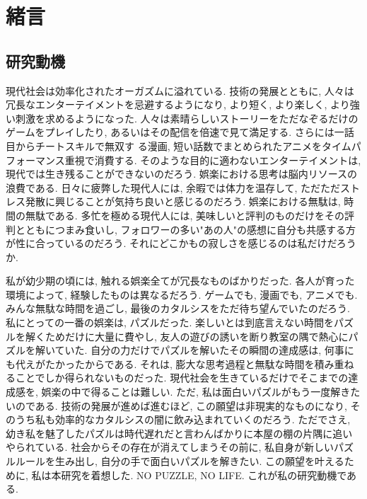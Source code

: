\chapter{緒言}
\section{研究動機}\label{section:Motivation}
現代社会は効率化されたオーガズムに溢れている. 技術の発展とともに, 人々は冗長なエンターテイメントを忌避するようになり, より短く, より楽しく, より強い刺激を求めるようになった. 人々は素晴らしいストーリーをただなぞるだけのゲームをプレイしたり, あるいはその配信を倍速で見て満足する. さらには一話目からチートスキルで無双す
る漫画, 短い話数でまとめられたアニメをタイムパフォーマンス重視で消費する. そのような目的に適わないエンターテイメントは, 現代では生き残ることができないのだろう. 娯楽における思考は脳内リソースの浪費である. 日々に疲弊した現代人には, 余暇では体力を温存して, ただただストレス発散に興じることが気持ち良いと感じるのだろう. 娯楽における無駄は, 時間の無駄である. 多忙を極める現代人には, 美味しいと評判のものだけをその評判とともにつまみ食いし, フォロワーの多い"あの人"の感想に自分も共感する方が性に合っているのだろう. それにどこかもの寂しさを感じるのは私だけだろうか.

私が幼少期の頃には, 触れる娯楽全てが冗長なものばかりだった. 各人が育った環境によって, 経験したものは異なるだろう. ゲームでも, 漫画でも, アニメでも. みんな無駄な時間を過ごし, 最後のカタルシスをただ待ち望んでいたのだろう.
私にとっての一番の娯楽は, パズルだった. 楽しいとは到底言えない時間をパズルを解くためだけに大量に費やし, 友人の遊びの誘いを断り教室の隅で熱心にパズルを解いていた. 自分の力だけでパズルを解いたその瞬間の達成感は, 何事にも代えがたかったからである. それは, 膨大な思考過程と無駄な時間を積み重ねることでしか得られないものだった. 現代社会を生きているだけでそこまでの達成感を, 娯楽の中で得ることは難しい. ただ, 私は面白いパズルがもう一度解きたいのである. 技術の発展が進めば進むほど, この願望は非現実的なものになり, そのうち私も効率的なカタルシスの闇に飲み込まれていくのだろう. ただでさえ, 幼き私を魅了したパズルは時代遅れだと言わんばかりに本屋の棚の片隅に追いやられている. 社会からその存在が消えてしまうその前に, 私自身が新しいパズルルールを生み出し, 自分の手で面白いパズルを解きたい. この願望を叶えるために, 私は本研究を着想した. NO PUZZLE, NO LIFE. これが私の研究動機である.

